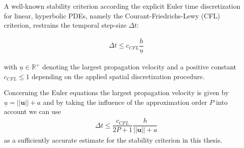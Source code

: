 	
	A well-known stability criterion according the explicit Euler time discretization for linear, hyperbolic PDEs, namely the Courant-Friedrichs-Lewy (CFL) criterion, restrains the temporal step-size $\Delta t$:
	
	\begin{align}
		\Delta t \leq c_{CFL} \dfrac{h}{\underline{u}}
	\end{align}
	
	with $\underline{u} \in \mathbb{R}^+$ denoting the largest propagation velocity and a positive constant $c_{CFL} \leq 1$ depending on the applied spatial discretization procedure.
	
	Concerning the Euler equations the largest propagation velocity is given by $\underline{u} = ||\mathbf{u} || + a$ and by taking the influence of the approximation order $P$ into account we can use 
	\begin{align}
		\Delta t \leq \dfrac{c_{CFL}}{2P+1} \dfrac{h}{||\mathbf{u} || + a}
	\end{align}
	as a sufficiently accurate estimate for the stability criterion in this thesis. 
